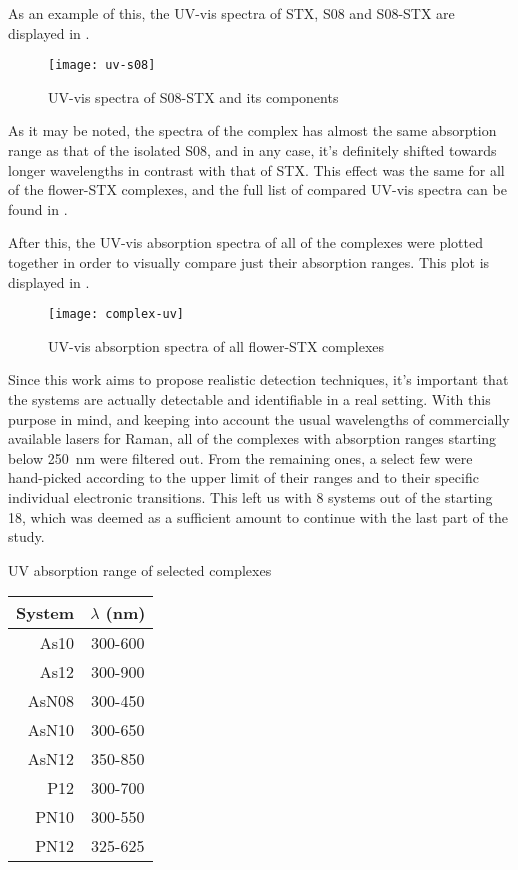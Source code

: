 As an example of this, the UV-vis spectra of STX, S08 and S08-STX are displayed in .

\begin{figure}
    \texttt{[image: uv-s08]}
    \caption[UV-vis spectrum of S08-STX]{UV-vis spectra of S08-STX and its components}
\end{figure}

As it may be noted, the spectra of the complex has almost the same absorption range as that of the isolated S08, and in any case, it's definitely shifted towards longer wavelengths in contrast with that of STX.
This effect was the same for all of the flower-STX complexes, and the full list of compared UV-vis spectra can be found in .

After this, the UV-vis absorption spectra of all of the complexes were plotted together in order to visually compare just their absorption ranges. This plot is displayed in .

\begin{figure*}
    \texttt{[image: complex-uv]}
    \caption[UV-vis absorption spectra of all complexes]{UV-vis absorption spectra of all flower-STX complexes}
\end{figure*}

Since this work aims to propose realistic detection techniques, it's important that the systems are actually detectable and identifiable in a real setting.
With this purpose in mind, and keeping into account the usual wavelengths of commercially available lasers for Raman, all of the complexes with absorption ranges starting below \SI{250}{\nano\metre} were filtered out.
From the remaining ones, a select few were hand-picked according to the upper limit of their ranges and to their specific individual electronic transitions.
This left us with 8 systems out of the starting 18, which was deemed as a sufficient amount to continue with the last part of the study.

\begin{margintable}
    \centering
    \caption[UV absorption range of selected complexes]{UV absorption range of selected complexes}
    \begin{tabular}{@{}rc@{}}
        \toprule
        System & $\lambda$ (\si{\nano\metre}) \\
        \midrule
        As10 & 300-600 \\
        As12 & 300-900 \\
        AsN08 & 300-450 \\
        AsN10 & 300-650 \\
        AsN12 & 350-850 \\
        P12 & 300-700 \\
        PN10 & 300-550 \\
        PN12 & 325-625 \\
    \end{tabular}
\end{margintable}

